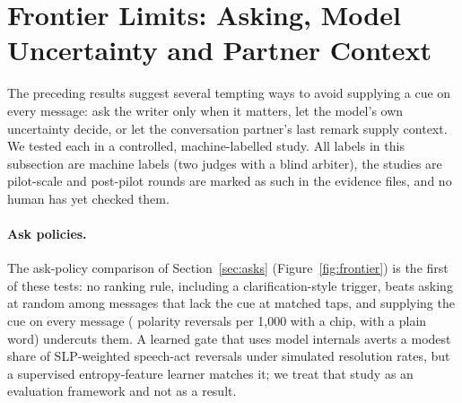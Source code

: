 \section{Frontier Limits: Asking, Model Uncertainty and Partner Context}\label{sec:frontier}

The preceding results suggest several tempting ways to avoid supplying a cue on every message: ask the writer only when it matters, let the model's own uncertainty decide, or let the conversation partner's last remark supply context.
We tested each in a controlled, machine-labelled study.
All labels in this subsection are machine labels (two judges with a blind arbiter), the studies are pilot-scale and post-pilot rounds are marked as such in the evidence files, and no human has yet checked them.

\paragraph{Ask policies.}
The ask-policy comparison of Section~\ref{sec:asks} (Figure~\ref{fig:frontier}) is the first of these tests: no ranking rule, including a clarification-style trigger, beats asking at random among messages that lack the cue at matched taps, and supplying the cue on every message (\jmfOneRevPolChip{} polarity reversals per 1,000 with a chip, \jmfOneRevPolWord{} with a plain word) undercuts them.
A learned gate that uses model internals averts a modest share of SLP-weighted speech-act reversals under simulated resolution rates, but a supervised entropy-feature learner matches it; we treat that study as an evaluation framework and not as a result.

